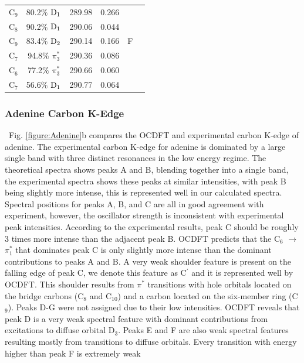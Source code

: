 \documentclass[12pt]{article}
\begin{document}
\begin{table}[!ht]
\begin{tabular*}{8.5cm}{@{\extracolsep{\fill} }cccccc}
    C$_9$
 &   80.2$\%$ $\rm D_1$  & 289.98 & 0.266 & \multirow{5}{*}{F} \\
    C$_8$
 &   90.2$\%$ $\rm D_1$  & 290.06 & 0.044 \\
    C$_9$
 &   83.4$\%$ $\rm D_2$  & 290.14 & 0.166
 \vspace{0.05in}\\
    C$_7$
 &   94.8$\%$ $\pi_3^*$  & 290.36 & 0.086  & \multirow{3}{*}{G} \\
    C$_6$
 &   77.2$\%$ $\pi_3^*$  & 290.66 & 0.060 \\
    C$_7$
 &   56.6$\%$ $\rm D_1$  & 290.77 & 0.064 \\
 \hline
 \hline
   \end{tabular*}
 \label{fig: adenine_k_nitrogen}
 \end{table}
\subsubsection{Adenine Carbon K-Edge}
\ Fig. \ref{figure:Adenine}b compares the OCDFT and experimental carbon K-edge of adenine. The experimental carbon K-edge for adenine is dominated by a large single band with three distinct resonances in the low energy regime. The theoretical spectra shows peaks A and B, blending together into a single band, the experimental spectra shows these peaks at similar intensities, with peak B being slightly more intense, this is represented well in our calculated spectra. Spectral positions for peaks A, B, and C are all in good agreement with experiment, 
however, the oscillator strength is inconsistent with experimental peak intensities. According to the experimental results, peak C should be roughly 3 times more intense than the adjacent peak B. OCDFT predicts that the C$_6$ $\rightarrow$ $\pi^*_1$ that dominates peak C is only slightly more intense than the dominant contributions to peaks A and B. A very weak shoulder feature is present on the falling edge of peak C, we denote this feature as C$^{\prime}$ and it is represented well by OCDFT. This shoulder results from $\pi^*$ transitions with hole orbitals located on the bridge carbons (C$_8$ and C$_{10}$) and a carbon located on the six-member ring (C$_9$). Peaks D-G were not assigned due to their low intensities. OCDFT reveals that peak D is a very weak spectral feature with dominant contributions from excitations to diffuse orbital D$_3$. Peaks E and F are also weak spectral features resulting mostly from transitions to diffuse orbitals. Every transition with energy higher than peak F is extremely weak 
\end{document}
